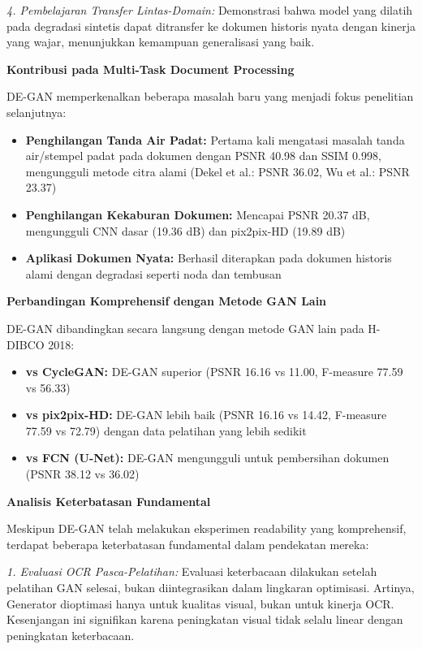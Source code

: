 \documentclass[12pt,a4paper]{article}
\begin{document}
\textit{4. Pembelajaran Transfer Lintas-Domain:} Demonstrasi bahwa model yang dilatih pada degradasi sintetis dapat ditransfer ke dokumen historis nyata dengan kinerja yang wajar, menunjukkan kemampuan generalisasi yang baik.

\textbf{Kontribusi pada Multi-Task Document Processing}

DE-GAN memperkenalkan beberapa masalah baru yang menjadi fokus penelitian selanjutnya:

\begin{itemize}
    \item \textbf{Penghilangan Tanda Air Padat:} Pertama kali mengatasi masalah tanda air/stempel padat pada dokumen dengan PSNR 40.98 dan SSIM 0.998, mengungguli metode citra alami (Dekel et al.: PSNR 36.02, Wu et al.: PSNR 23.37)
    \item \textbf{Penghilangan Kekaburan Dokumen:} Mencapai PSNR 20.37 dB, mengungguli CNN dasar (19.36 dB) dan pix2pix-HD (19.89 dB)
    \item \textbf{Aplikasi Dokumen Nyata:} Berhasil diterapkan pada dokumen historis alami dengan degradasi seperti noda dan tembusan
\end{itemize}

\textbf{Perbandingan Komprehensif dengan Metode GAN Lain}

DE-GAN dibandingkan secara langsung dengan metode GAN lain pada H-DIBCO 2018:

\begin{itemize}
    \item \textbf{vs CycleGAN:} DE-GAN superior (PSNR 16.16 vs 11.00, F-measure 77.59 vs 56.33)
    \item \textbf{vs pix2pix-HD:} DE-GAN lebih baik (PSNR 16.16 vs 14.42, F-measure 77.59 vs 72.79) dengan data pelatihan yang lebih sedikit
    \item \textbf{vs FCN (U-Net):} DE-GAN mengungguli untuk pembersihan dokumen (PSNR 38.12 vs 36.02)
\end{itemize}

\textbf{Analisis Keterbatasan Fundamental}

Meskipun DE-GAN telah melakukan eksperimen readability yang komprehensif, terdapat beberapa keterbatasan fundamental dalam pendekatan mereka:

\textit{1. Evaluasi OCR Pasca-Pelatihan:}
Evaluasi keterbacaan dilakukan setelah pelatihan GAN selesai, bukan diintegrasikan dalam lingkaran optimisasi. Artinya, Generator dioptimasi hanya untuk kualitas visual, bukan untuk kinerja OCR. Kesenjangan ini signifikan karena peningkatan visual tidak selalu linear dengan peningkatan keterbacaan.
\end{document}
